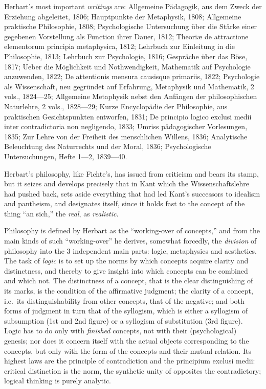 Herbart's most important \emph{writings} are: Allgemeine Pädagogik, aus
dem Zweck der Erziehung abgeleitet, 1806; Hauptpunkte der Metaphysik,
1808; Allgemeine praktische Philosophie, 1808; Psychologische
Untersuchung über die Stärke einer gegebenen
Vorstellung als Function ihrer Dauer, 1812; Theoriæ de attractione
elementorum principia metaphysica, 1812; Lehrbuch zur Einleitung in die
Philosophie, 1813; Lehrbuch zur Psychologie, 1816; Gespräche über das
Böse, 1817; Ueber die Möglichkeit und Nothwendigkeit, Mathematik auf
Psychologie anzuwenden, 1822; De attentionis mensura causisque
primariis, 1822; Psychologie als Wissenschaft, neu gegründet auf
Erfahrung, Metaphysik und Mathematik, 2 vols., 1824---25; Allgemeine
Metaphysik nebst den Anfängen der philosophischen Naturlehre, 2 vols.,
1828---29; Kurze Encyclopädie der Philosophie, aus praktischen
Gesichtspunkten entworfen, 1831; De principio
logico exclusi medii inter contradictoria non negligendo, 1833; Umriss
pädagogischer Vorlesungen, 1835; Zur Lehre von der Freiheit des
menschlichen Willens, 1836; Analytische Beleuchtung des Naturrechts und
der Moral, 1836; Psychologische Untersuchungen, Hefte 1---2,
1839---40.

\divrule

Herbart's philosophy, like Fichte's, has issued from criticism and bears
its stamp, but it seizes and develops precisely that in Kant which the
Wissenschaftslehre had pushed back, sets aside everything that had led
Kant's successors to idealism and pantheism, and designates itself,
since it holds fast to the concept of the thing ``an sich,''
the \emph{real}, as \emph{realistic}.

Philosophy is defined by Herbart as the ``working-over of concepts,''
and from the main kinds of such ``working-over'' he derives, somewhat
forcedly, the \emph{division} of philosophy into the 3 independent main
parts: logic, metaphysics and aesthetics. The task of \emph{logic} is
to set up the norms by which concepts acquire clarity and distinctness,
and thereby to give insight into which concepts can be combined and
which not. The distinctness of a concept, that is the clear
distinguishing of its marks, is the condition of the affirmative
judgment; the clarity of a concept, i.e.\ its distinguishability from
other concepts, that of the negative; and both forms of judgment in
turn that of the syllogism, which is either a syllogism of subsumption
(1st and 2nd figure) or a syllogism of substitution (3rd figure). Logic
has to do only with \emph{finished} concepts, not with their
(psychological) genesis; nor does it concern itself with the actual
objects corresponding to the concepts, but only with the form of the
concepts and their mutual relation. Its highest laws are the principle
of contradiction and the principium exclusi medii: critical distinction
is the norm, the synthetic unity of opposites the contradictory; logical
thinking is purely analytic.

